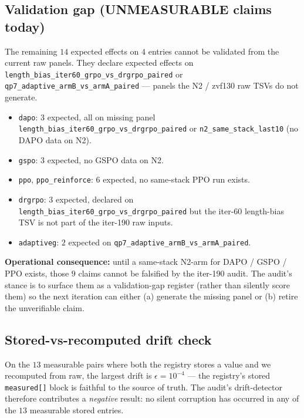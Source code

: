 \subsection{Validation gap (UNMEASURABLE claims today)}
The remaining $14$ expected effects on $4$ entries cannot be validated
from the current raw panels. They declare expected effects on
\texttt{length\_bias\_iter60\_grpo\_vs\_drgrpo\_paired} or
\texttt{qp7\_adaptive\_armB\_vs\_armA\_paired} --- panels the N2 /
zvf130 raw TSVs do not generate.

\begin{itemize}
  \item \texttt{dapo}: $3$ expected, all on missing panel
    \texttt{length\_bias\_iter60\_grpo\_vs\_drgrpo\_paired} or
    \texttt{n2\_same\_stack\_last10} (no DAPO data on N2).
  \item \texttt{gspo}: $3$ expected, no GSPO data on N2.
  \item \texttt{ppo}, \texttt{ppo\_reinforce}: $6$ expected, no
    same-stack PPO run exists.
  \item \texttt{drgrpo}: $3$ expected, declared on
    \texttt{length\_bias\_iter60\_grpo\_vs\_drgrpo\_paired} but the
    iter-60 length-bias TSV is not part of the iter-190 raw inputs.
  \item \texttt{adaptiveg}: $2$ expected on
    \texttt{qp7\_adaptive\_armB\_vs\_armA\_paired}.
\end{itemize}

\noindent\textbf{Operational consequence:} until a same-stack N2-arm
for DAPO / GSPO / PPO exists, those $9$ claims cannot be falsified by
the iter-190 audit. The audit's stance is to surface them as a
validation-gap register (rather than silently score them) so the
next iteration can either (a) generate the missing panel or (b)
retire the unverifiable claim.

\subsection{Stored-vs-recomputed drift check}
On the $13$ measurable pairs where both the registry stores a value
and we recomputed from raw, the largest drift is $\epsilon{=}10^{-4}$
--- the registry's stored \texttt{measured[]} block is faithful to the
source of truth. The audit's drift-detector therefore contributes a
\emph{negative} result: no silent corruption has occurred in any of
the $13$ measurable stored entries.


